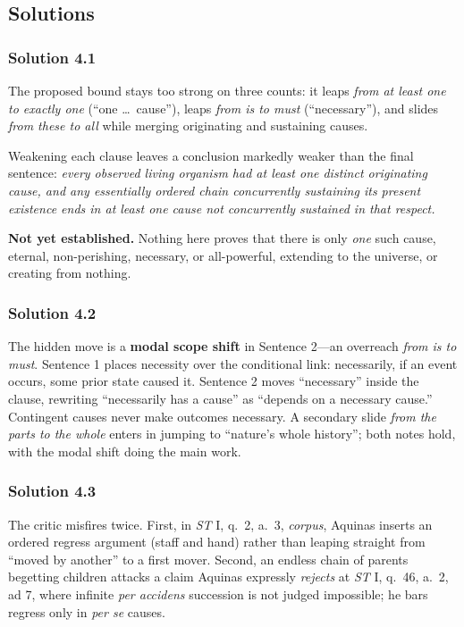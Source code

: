 \subsection{Solutions}

\subsubsection*{Solution 4.1}

The proposed bound stays too strong on three counts: it leaps \emph{from at least one to exactly one} (``one \dots\ cause''), leaps \emph{from is to must} (``necessary''), and slides \emph{from these to all} while merging originating and sustaining causes.

Weakening each clause leaves a conclusion markedly weaker than the final sentence: \emph{every observed living organism had at least one distinct originating cause, and any essentially ordered chain concurrently sustaining its present existence ends in at least one cause not concurrently sustained in that respect.}

\textbf{Not yet established.} Nothing here proves that there is only \emph{one} such cause, eternal, non-perishing, necessary, or all-powerful, extending to the universe, or creating from nothing.

\subsubsection*{Solution 4.2}

The hidden move is a \textbf{modal scope shift} in Sentence 2---an overreach \emph{from is to must}. Sentence 1 places necessity over the conditional link: necessarily, if an event occurs, some prior state caused it. Sentence 2 moves ``necessary'' inside the clause, rewriting ``necessarily has a cause'' as ``depends on a necessary cause.'' Contingent causes never make outcomes necessary. A secondary slide \emph{from the parts to the whole} enters in jumping to ``nature's whole history''; both notes hold, with the modal shift doing the main work.

\subsubsection*{Solution 4.3}

The critic misfires twice. First, in \emph{ST} I, q.\ 2, a.\ 3, \emph{corpus}, Aquinas inserts an ordered regress argument (staff and hand) rather than leaping straight from ``moved by another'' to a first mover. Second, an endless chain of parents begetting children attacks a claim Aquinas expressly \emph{rejects} at \emph{ST} I, q.\ 46, a.\ 2, ad 7, where infinite \emph{per accidens} succession is not judged impossible; he bars regress only in \emph{per se} causes.

